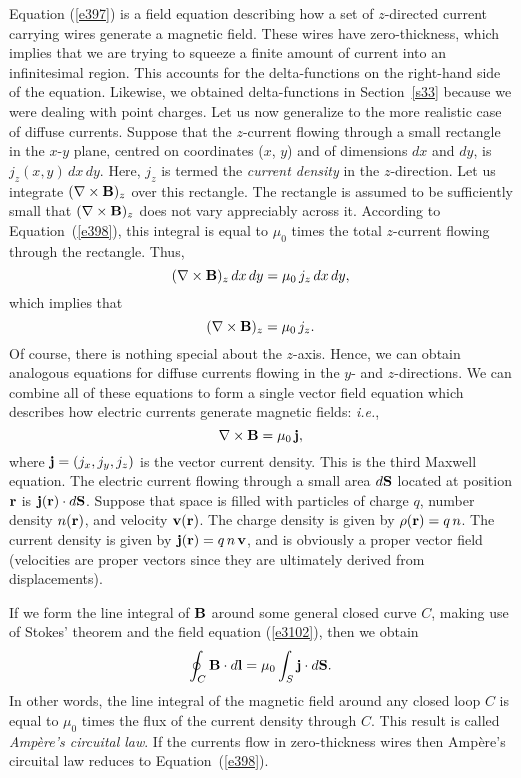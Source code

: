 Equation (\ref{e397}) is a field equation describing how a set of $z$-directed
current carrying wires generate a magnetic field. These wires have
zero-thickness, which implies that we are trying to squeeze a finite amount of
current into an infinitesimal region. This
accounts for the delta-functions on the right-hand side of
the equation. Likewise, we obtained  delta-functions in Section~\ref{s33}
because we were dealing with point charges. Let us now generalize to the more
realistic case of diffuse currents. Suppose that the $z$-current flowing through
 a small
 rectangle in the $x$-$y$ plane, centred on  coordinates ($x$, $y$) and of dimensions
$dx$ and $dy$, is $j_z(x,y)\,dx\,dy$. Here, $j_z$ is termed the {\em current density}\/ in
the $z$-direction. Let us integrate $(\nabla\times{\bf B})_z$ over this rectangle.
The rectangle is assumed to be sufficiently small that $(\nabla\times{\bf B})_z$
does not vary appreciably across it. According to Equation~(\ref{e398}), this integral is
equal to $\mu_0$ times the total $z$-current flowing through the rectangle. Thus,
\begin{equation}
(\nabla\times{\bf B})_z \,dx\,dy = \mu_0\, j_z\,dx\,dy,
\end{equation}
which implies that
\begin{equation}
(\nabla\times{\bf B})_z = \mu_0 \,j_z.\label{e3100}
\end{equation}
Of course, there is nothing special about the $z$-axis.
Hence, we can obtain analogous equations for diffuse currents flowing
in the $y$- and $z$-directions. We can combine all of these equations
to form a single vector field equation
which 
describes how  electric currents generate magnetic fields: {\em i.e.},
\begin{equation}
\nabla\times{\bf B} = \mu_0 \,{\bf j},\label{e3102}
\end{equation}
where ${\bf j} = (j_x, j_y, j_z)$ is the vector current density.
This is the third Maxwell equation. The electric current flowing through a
small area $d{\bf S}$ located at position ${\bf r}$ is ${\bf j}({\bf r})
 \cdot d{\bf S}$.
Suppose that space is filled with  particles of charge $q$,  number density
$n({\bf r})$, and velocity ${\bf v}({\bf r})$. The charge density is
given by $\rho({\bf r})= q\,n$. The current density is given
by ${\bf j}({\bf r})
 = q \,n\, {\bf v}$, and  is obviously a proper vector field (velocities
are proper vectors since they are ultimately derived from displacements). 

If we form the line integral of ${\bf B}$ around some general closed curve
$C$, making use of Stokes' theorem and the field equation (\ref{e3102}), then we
obtain
\begin{equation}\label{e3103}
\oint_C {\bf B} \cdot d{\bf l} = \mu_0 \int_S {\bf j} \cdot d{\bf S}.
\end{equation}
In other words, the line integral of the magnetic field around any closed loop
$C$ 
is equal to $\mu_0$ times the flux of the current density through $C$. This
result is called {\em Amp\`{e}re's circuital law}. If the currents flow in 
zero-thickness wires then Amp\`{e}re's circuital law reduces to Equation~(\ref{e398}).

